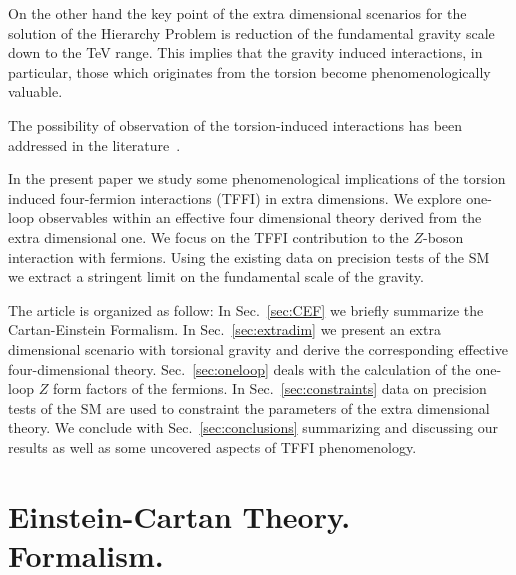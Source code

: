 \documentclass[twocolumn,showpacs,showkeys,prd,superscriptaddress]{revtex4-1}
\begin{document}
On the other hand the key point of the extra dimensional scenarios  \cite{Randall:1999ee,ArkaniHamed:1998rs} for the solution of the Hierarchy Problem is reduction of the fundamental gravity scale down to the \si{\TeV} range.  This implies that the gravity induced  interactions, in particular, those which originates from the torsion become phenomenologically valuable.


The possibility of observation of the torsion-induced interactions has been addressed in the literature~\cite{Belyaev:1998ax,CastilloFelisola:2012fy,Lebedev:2002dp,Kostelecky:2007kx}.


In the present paper we study some phenomenological implications of the torsion induced four-fermion interactions (TFFI) in extra dimensions.
We explore one-loop observables within an effective four dimensional theory derived from the extra dimensional one. We focus on the TFFI contribution to the  $Z$-boson interaction with fermions. Using the existing data on precision tests of the SM~\cite{Altarelli:2004fq,Beringer:1900zz} we extract a stringent limit on the fundamental scale of the gravity. 

The article is organized as follow: In Sec.~\ref{sec:CEF}  we briefly summarize the Cartan-Einstein Formalism. In Sec.~\ref{sec:extradim}  we present an extra dimensional scenario with torsional gravity and derive the corresponding effective four-dimensional theory. Sec.~\ref{sec:oneloop} deals with the calculation of the one-loop $Z$ form factors of the fermions. In Sec.~\ref{sec:constraints} data on precision tests of the SM are used to constraint the parameters of the extra dimensional theory. We conclude with Sec.~\ref{sec:conclusions} summarizing and discussing our results as well as some uncovered aspects of TFFI phenomenology.


\section{\label{sec:CEF} Einstein-Cartan Theory. Formalism.}
\end{document}
